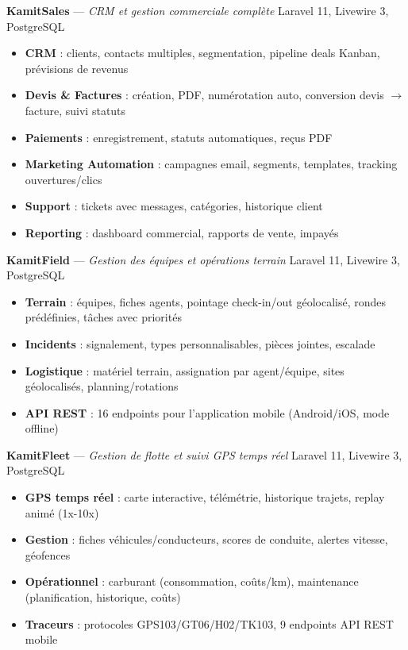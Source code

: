 \documentclass[a4paper,11pt]{article}
\begin{document}
{\textbf{\color{darktext}KamitSales} — \textit{CRM et gestion commerciale complète}} \hfill {\small\color{graytext}Laravel 11, Livewire 3, PostgreSQL}
\begin{itemize}[leftmargin=12pt, itemsep=0pt, topsep=2pt]
    \item \textbf{CRM} : clients, contacts multiples, segmentation, pipeline deals Kanban, prévisions de revenus
    \item \textbf{Devis \& Factures} : création, PDF, numérotation auto, conversion devis $\rightarrow$ facture, suivi statuts
    \item \textbf{Paiements} : enregistrement, statuts automatiques, reçus PDF
    \item \textbf{Marketing Automation} : campagnes email, segments, templates, tracking ouvertures/clics
    \item \textbf{Support} : tickets avec messages, catégories, historique client
    \item \textbf{Reporting} : dashboard commercial, rapports de vente, impayés
\end{itemize}

\vspace{3pt}

{\textbf{\color{darktext}KamitField} — \textit{Gestion des équipes et opérations terrain}} \hfill {\small\color{graytext}Laravel 11, Livewire 3, PostgreSQL}
\begin{itemize}[leftmargin=12pt, itemsep=0pt, topsep=2pt]
    \item \textbf{Terrain} : équipes, fiches agents, pointage check-in/out géolocalisé, rondes prédéfinies, tâches avec priorités
    \item \textbf{Incidents} : signalement, types personnalisables, pièces jointes, escalade
    \item \textbf{Logistique} : matériel terrain, assignation par agent/équipe, sites géolocalisés, planning/rotations
    \item \textbf{API REST} : 16 endpoints pour l'application mobile (Android/iOS, mode offline)
\end{itemize}

\vspace{3pt}

{\textbf{\color{darktext}KamitFleet} — \textit{Gestion de flotte et suivi GPS temps réel}} \hfill {\small\color{graytext}Laravel 11, Livewire 3, PostgreSQL}
\begin{itemize}[leftmargin=12pt, itemsep=0pt, topsep=2pt]
    \item \textbf{GPS temps réel} : carte interactive, télémétrie, historique trajets, replay animé (1x-10x)
    \item \textbf{Gestion} : fiches véhicules/conducteurs, scores de conduite, alertes vitesse, géofences
    \item \textbf{Opérationnel} : carburant (consommation, coûts/km), maintenance (planification, historique, coûts)
    \item \textbf{Traceurs} : protocoles GPS103/GT06/H02/TK103, 9 endpoints API REST mobile
\end{itemize}
\end{document}
